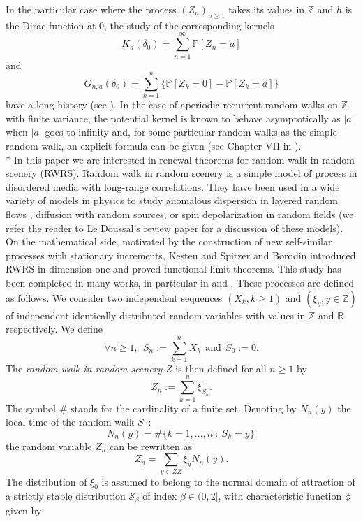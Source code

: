 \documentclass[oneside, a4paper,11pt,reqno]{amsart}
\begin{document}
In the particular case where the process $(Z_n)_{n\geq 1}$ takes its values in $\mathbb{Z}$ and $h$ is the Dirac function at 0, the study of the corresponding kernels
$$K_a(\delta_0)= \sum_{n=1}^{\infty} \mathbb{P}[Z_n=a]$$
and
$$G_{n,a}(\delta_0)= \sum_{k=1}^n \Big\{\mathbb{P}[Z_k=0] - \mathbb{P}[Z_k=a]\Big\}$$  
have a long history (see \cite{spitzer}). 
In the case of aperiodic recurrent random walks on $\mathbb{Z}$  with finite variance, the potential kernel is known to behave asymptotically as $|a|$ 
when $|a|$ goes to infinity
and, for some particular  random walks as the simple random walk,  an explicit formula can be given  (see Chapter VII in \cite{spitzer}). \\*
In this paper we are interested in renewal theorems for random walk in random scenery (RWRS). Random walk in random scenery  is a simple model of process in disordered
media with long-range correlations. They have been used in a wide
variety of models in physics to study anomalous dispersion in layered
random flows \cite{matheron_demarsily},  diffusion with random sources, 
or spin depolarization in random fields (we refer the reader
to Le Doussal's review paper \cite{ledoussal} for a discussion of these
models). On the mathematical side, motivated by the construction of 
new self-similar processes with stationary increments, 
Kesten and Spitzer \cite{KestenSpitzer} and Borodin  \cite{Borodin, Borodin1} 
introduced RWRS in dimension one and proved functional limit theorems. 
This study has been completed in many works, in particular in
\cite{bolthausen} and \cite{DU}.
These processes are defined as follows. 
We consider two independent sequences $(X_k,k\ge 1)$ and 
$(\xi_y,y\in\mathbb Z)$
of independent identically distributed random variables with values 
in $\mathbb Z$ and $\mathbb R$ respectively.
We define 
$$\forall n\ge 1,\ \ S_n:=\sum_{k=1}^nX_k\ \ \mbox{and}\ \ S_0:=0.$$
The {\it random walk in random scenery} $Z$ is 
then defined for all $n\ge 1$ by
$$Z_n:=\sum_{k=1}^{n}\xi_{S_k}.$$ 
The symbol $\#$ stands for the cardinality of a finite set. Denoting by  
$N_n(y)$ the local time of the random walk $S$~:
$$N_n(y)=\#\big\{k=1,...,n\ :\ S_k=y\big\} \, 
$$
the random variable $Z_n$ can be rewritten as 
\begin{equation} 
\label{re-ecriture-Zn}
Z_n=\sum_{y\in{{Z\!\!\!Z}}}\xi_yN_n(y).
\end{equation}
The distribution of $\xi_0$ is assumed to belong to the normal 
domain of attraction of a strictly stable distribution 
$\mathcal{S}_{\beta}$ of 
index $\beta\in (0,2]$, with characteristic function $\phi$ given by
\end{document}
